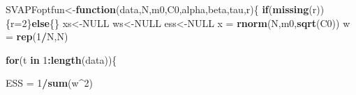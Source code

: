 \documentclass[
]{book}
\newenvironment{Shaded}{\begin{snugshade}}{\end{snugshade}}
\newcommand{\ControlFlowTok}[1]{\textcolor[rgb]{0.13,0.29,0.53}{\textbf{#1}}}
\newcommand{\DecValTok}[1]{\textcolor[rgb]{0.00,0.00,0.81}{#1}}
\newcommand{\KeywordTok}[1]{\textcolor[rgb]{0.13,0.29,0.53}{\textbf{#1}}}
\newcommand{\NormalTok}[1]{#1}
\newcommand{\OperatorTok}[1]{\textcolor[rgb]{0.81,0.36,0.00}{\textbf{#1}}}
\newcommand{\OtherTok}[1]{\textcolor[rgb]{0.56,0.35,0.01}{#1}}
\newcommand{\StringTok}[1]{\textcolor[rgb]{0.31,0.60,0.02}{#1}}
\theoremstyle{break}
\theoremstyle{nonumberplain}
\begin{document}
\begin{Shaded}
\begin{Highlighting}[]
\NormalTok{SVAPFoptfun<-}\ControlFlowTok{function}\NormalTok{(data,N,m0,C0,alpha,beta,tau,r)\{}
  \ControlFlowTok{if}\NormalTok{(}\KeywordTok{missing}\NormalTok{(r))\{r=}\DecValTok{2}\NormalTok{\}}\ControlFlowTok{else}\NormalTok{\{\}}
\NormalTok{  xs<-}\OtherTok{NULL}
\NormalTok{  ws<-}\OtherTok{NULL}
\NormalTok{  ess<-}\OtherTok{NULL}
\NormalTok{  x  =}\StringTok{ }\KeywordTok{rnorm}\NormalTok{(N,m0,}\KeywordTok{sqrt}\NormalTok{(C0))}
\NormalTok{  w  =}\StringTok{ }\KeywordTok{rep}\NormalTok{(}\DecValTok{1}\OperatorTok{/}\NormalTok{N,N)}
  
  \ControlFlowTok{for}\NormalTok{(t }\ControlFlowTok{in} \DecValTok{1}\OperatorTok{:}\KeywordTok{length}\NormalTok{(data))\{}
    
\NormalTok{    ESS  =}\StringTok{ }\DecValTok{1}\OperatorTok{/}\KeywordTok{sum}\NormalTok{(w}\OperatorTok{^}\DecValTok{2}\NormalTok{)}
    

\end{Highlighting}
\end{Shaded}
\end{document}
